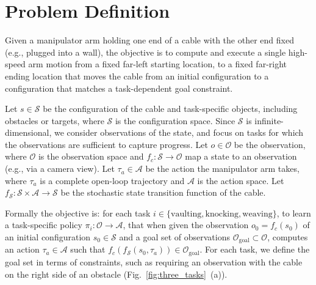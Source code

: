 \section{Problem Definition}
Given a manipulator arm holding one end of a cable with the other end fixed (e.g., plugged into a wall), the objective is to compute and execute a single high-speed arm motion from a fixed far-left starting location, to a fixed far-right ending location that moves the cable from an initial configuration to a configuration that matches a task-dependent goal constraint.

Let $s \in \mathcal{S}$ be the configuration of the cable and task-specific objects, including obstacles or targets, where $\mathcal{S}$ is the configuration space.
Since $\mathcal{S}$ is infinite-dimensional, we consider observations of the state, and focus on tasks for which the observations are sufficient to capture progress.  Let $o \in \mathcal{O}$ be the observation, where $\mathcal{O}$ is the observation space and $f_c : \mathcal{S} \rightarrow \mathcal{O}$ map a state to an observation (e.g., via a camera view).
Let $\tau_a \in \mathcal{A}$ be the action the manipulator arm takes, where $\tau_a$ is a complete open-loop trajectory and $\mathcal{A}$ is the action space.
Let $f_\mathcal{S} : \mathcal{S} \times \mathcal{A} \rightarrow \mathcal{S}$ be the stochastic state transition function of the cable.


Formally the objective is: for each task $i \in \{ \mathrm{vaulting},\allowbreak \mathrm{knocking},\allowbreak \mathrm{weaving} \}$, to learn a task-specific policy $\pi_i : \mathcal{O} \rightarrow \mathcal{A}$, that when given the observation $o_0 = f_c(s_0)$ of 
an initial configuration $s_0 \in \mathcal{S}$ and a goal set of observations $\mathcal{O}_\mathrm{goal} \subset \mathcal{O}$, computes an action $\tau_a \in \mathcal{A}$ such that $f_c(f_\mathcal{S}(s_0,\tau_a)) \in \mathcal{O}_\mathrm{goal}$. For each task, we define the goal set in terms of constraints, such as requiring an observation with the cable on the right side of an obstacle (Fig.~\ref{fig:three_tasks}~(a)).



